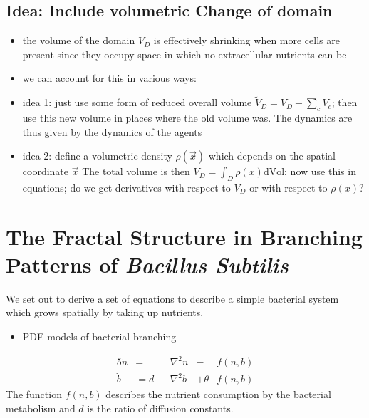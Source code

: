 \subsection{Idea: Include volumetric Change of domain}
\begin{itemize}
    \item the volume of the domain $V_D$ is effectively shrinking when more cells are present since
        they occupy space in which no extracellular nutrients can be
    \item we can account for this in various ways:
    \item idea 1: just use some form of reduced overall volume $\tilde{V}_D=V_D-\sum_c V_c$; then
        use this new volume in places where the old volume was.
        The dynamics are thus given by the dynamics of the agents
    \item idea 2: define a volumetric density $\rho(\vec{x})$ which depends on
        the spatial coordinate $\vec{x}$
        The total volume is then $V_D=\int_D \rho(x)\text{dVol}$; now use this in equations; do we
        get derivatives with respect to $V_D$ or with respect to $\rho(x)$?
\end{itemize}

\newpage
\section{The Fractal Structure in Branching Patterns of \textit{Bacillus Subtilis}}
We set out to derive a set of equations to describe a simple bacterial system which grows
spatially by taking up nutrients.

\begin{itemize}
    \item PDE models of bacterial branching \cite{Kawasaki1997,Matsushita1998}
\end{itemize}

\begin{alignat}{5}
    \dot{n} &= &&\nabla^2n &- &f(n, b)\\
    \dot{b} &= d&&\nabla^2b &+ \theta &f(n, b)
\end{alignat}
The function $f(n,b)$ describes the nutrient consumption by the bacterial metabolism and $d$ is the
ratio of diffusion constants.


